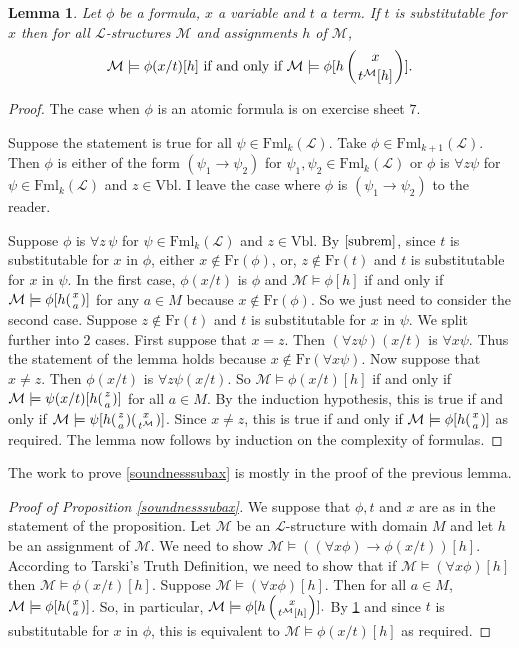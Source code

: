 \documentclass[11pt]{article}
\newcommand{\Fml}{\textrm{Fml}}
\newcommand{\Fr}{\textrm{Fr}}
\newcommand{\Vbl}{\textrm{Vbl}}
\newtheorem{lemma}[theorem]{Lemma}
\newcommand{\mcal}[1]{\mathcal{#1}}
\begin{document}
\begin{lemma}\label{sublemma}
Let $\phi$ be a formula, $x$ a variable and $t$ a term. If $t$ is substitutable for $x$ then for all $\mcal{L}$-structures $\mcal{M}$ and assignments $h$ of $\mcal{M}$,
\[\mcal{M}\models \phi(x/t)[h] \text{ if and only if } \mcal{M}\models \phi[h\left({x\atop t^{\mcal{M}}[h]}\right)].\]
\end{lemma}
\begin{proof}
The case when $\phi$ is an atomic formula is on exercise sheet $7$.

Suppose the statement is true for all $\psi\in \Fml_k(\mcal{L})$. Take $\phi\in\Fml_{k+1}(\mcal{L})$. Then $\phi$ is either of the form $(\psi_1\rightarrow \psi_2)$ for $\psi_1,\psi_2\in \Fml_k(\mcal{L})$ or $\phi$ is $\forall z\psi$ for $\psi\in\Fml_k(\mcal{L})$ and $z\in\Vbl$.
I leave the case where $\phi$ is $(\psi_1\rightarrow \psi_2)$ to the reader.

Suppose $\phi$ is $\forall z\,\psi$ for $\psi\in\Fml_k(\mcal{L})$ and $z\in\Vbl$. By $\ref{subrem}$, since $t$ is substitutable for $x$ in $\phi$, either $x\notin \Fr(\phi)$, or, $z\notin\Fr(t)$ and $t$ is substitutable for $x$ in $\psi$. In the first case, $\phi(x/t)$ is $\phi$ and $\mcal{M}\models \phi[h]$ if and only if $\mcal{M}\models \phi[h({x\atop a})]$ for any $a\in M$ because $x\notin\Fr(\phi)$. So we just need to consider the second case. Suppose $z\notin\Fr(t)$ and $t$ is substitutable for $x$ in $\psi$. We split further into $2$ cases. First suppose that $x=z$. Then $(\forall z\psi)(x/t)$ is $\forall x\psi$. Thus the statement of the lemma holds because $x\notin \Fr(\forall x\psi)$. Now suppose that $x\neq z$. Then $\phi(x/t)$ is $\forall z \psi(x/t)$. So $\mcal{M}\models \phi(x/t)[h]$ if and only if $\mcal{M}\models \psi(x/t)[h({z\atop a})]$ for all $a\in M$. By the induction hypothesis, this is true if and only if $\mcal{M}\models \psi[h({z\atop a})({x\atop t^{\mcal{M}}})]$. Since $x\neq z$, this is true if and only if $\mcal{M}\models \phi[h({x\atop a})]$ as required. The lemma now follows by induction on the complexity of formulas.
\end{proof}

The work to prove \ref{soundnesssubax} is mostly in the proof of the previous lemma.

\begin{proof}[Proof of Proposition \ref{soundnesssubax}] We suppose that $\phi, t$ and $x$ are as in the statement of the proposition.
Let $\mcal{M}$ be an $\mcal{L}$-structure with domain $M$ and let $h$ be an assignment of $\mcal{M}$. We need to show $\mcal{M}\models ((\forall x \phi)\rightarrow \phi(x/t)) [h]$. According to Tarski's Truth Definition, we need to show that if $\mcal{M}\models (\forall x \phi)[h]$ then $\mcal{M}\models\phi(x/t)[h]$. Suppose $\mcal{M}\models (\forall x \phi)[h]$. Then for all $a\in M$, $\mcal{M}\models \phi[h({x\atop a})]$. So, in particular, $\mcal{M}\models \phi[h\left({x\atop t^{\mcal{M}}[h]}\right)].$ By \ref{sublemma} and since $t$ is substitutable for $x$ in $\phi$, this is equivalent to $\mcal{M}\models \phi(x/t)[h]$ as required.
\end{proof}
\end{document}
